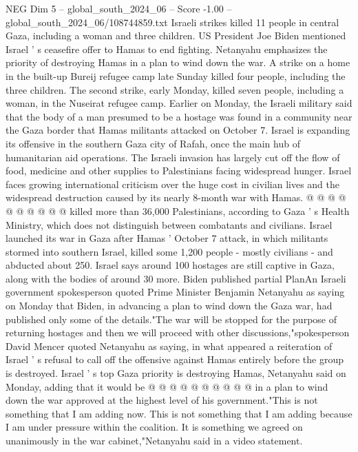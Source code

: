 \begin{textsample}{NEG Dim 5 – global\_south\_2024\_06 – Score -1.00 – global\_south\_2024\_06/108744859.txt}  \label{ex:f5_neg_233}
Israeli strikes killed 11 people in central Gaza, including a woman and three children.
US President Joe Biden mentioned Israel ' s ceasefire offer to Hamas to end fighting.
Netanyahu emphasizes the priority of destroying Hamas in a plan to wind down the war.
A strike on a home in the built-up Bureij refugee camp late Sunday killed four people, including the three children.
The second strike, early Monday, killed seven people, including a woman, in the Nuseirat refugee camp.
Earlier on Monday, the Israeli military said that the body of a man presumed to be a hostage was found in a community near the Gaza border that Hamas militants attacked on October 7.
Israel is expanding its offensive in the southern Gaza city of Rafah, once the main hub of humanitarian aid operations.
The Israeli invasion has largely cut off the flow of food, medicine and other supplies to Palestinians facing widespread hunger.
Israel faces growing international criticism over the huge cost in civilian lives and the widespread destruction caused by its nearly 8-month war with Hamas. @ @ @ @ @ @ @ @ @ @ killed more than 36,000 Palestinians, according to Gaza ' s Health Ministry, which does not distinguish between combatants and civilians.
Israel launched its war in Gaza after Hamas ' October 7 attack, in which militants stormed into southern Israel, killed some 1,200 people - mostly civilians - and abducted about 250.
Israel says around 100 hostages are still captive in Gaza, along with the bodies of around 30 more.
Biden published partial PlanAn Israeli government spokesperson quoted Prime Minister Benjamin Netanyahu as saying on Monday that Biden, in advancing a plan to wind down the Gaza war, had published only some of the details."The war will be stopped for the purpose of returning hostages and then we will proceed with other discussions,"spokesperson David Mencer quoted Netanyahu as saying, in what appeared a reiteration of Israel ' s refusal to call off the offensive against Hamas entirely before the group is destroyed.
Israel ' s top Gaza priority is destroying Hamas, Netanyahu said on Monday, adding that it would be @ @ @ @ @ @ @ @ @ @ in a plan to wind down the war approved at the highest level of his government."This is not something that I am adding now.
This is not something that I am adding because I am under pressure within the coalition.
It is something we agreed on unanimously in the war cabinet,"Netanyahu said in a video statement.

\end{textsample}
